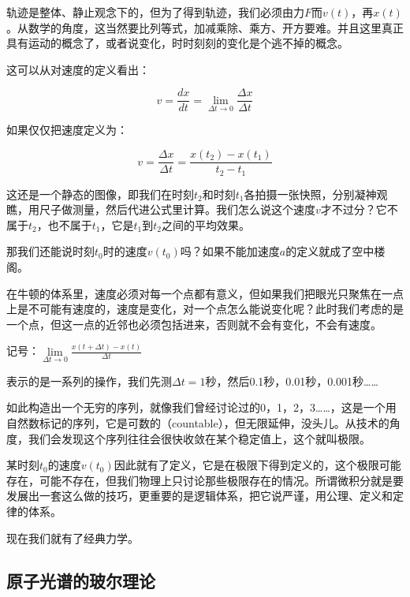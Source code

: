 轨迹是整体、静止观念下的，但为了得到轨迹，我们必须由力$F$而$v(t)$，再$x(t)$。从数学的角度，这当然要比列等式，加减乘除、乘方、开方要难。并且这里真正具有运动的概念了，或者说变化，时时刻刻的变化是个逃不掉的概念。

这可以从对速度的定义看出：

\begin{equation}
v = \frac{d x }{d t} = \lim\limits_{\Delta t \to 0} \frac{\Delta x}{\Delta t}
\end{equation}

如果仅仅把速度定义为：

\begin{equation}
v = \frac{\Delta x}{\Delta t} = \frac{ x(t_2) - x(t_1) }{ t_2 - t_1 }
\end{equation}

这还是一个静态的图像，即我们在时刻$t_2$和时刻$t_1$各拍摄一张快照，分别凝神观瞧，用尺子做测量，然后代进公式里计算。我们怎么说这个速度$v$才不过分？它不属于$t_2$，也不属于$t_1$，它是$t_1$到$t_2$之间的平均效果。

那我们还能说时刻$t_0$时的速度$v(t_0)$吗？如果不能加速度$a$的定义就成了空中楼阁。

在牛顿的体系里，速度必须对每一个点都有意义，但如果我们把眼光只聚焦在一点上是不可能有速度的，速度是变化，对一个点怎么能说变化呢？此时我们考虑的是一个点，但这一点的近邻也必须包括进来，否则就不会有变化，不会有速度。

\begin{center}
记号：$\lim\limits_{\Delta t \to 0} \frac{ x(t + \Delta t) - x(t) }{\Delta t}$
\end{center}

表示的是一系列的操作，我们先测$\Delta t = 1$秒，然后0.1秒，0.01秒，0.001秒……

如此构造出一个无穷的序列，就像我们曾经讨论过的0，1，2，3……，这是一个用自然数标记的序列，它是可数的（countable），但无限延伸，没头儿。从技术的角度，我们会发现这个序列往往会很快收敛在某个稳定值上，这个就叫极限。

某时刻$t_0$的速度$v(t_0)$因此就有了定义，它是在极限下得到定义的，这个极限可能存在，可能不存在，但我们物理上只讨论那些极限存在的情况。所谓微积分就是要发展出一套这么做的技巧，更重要的是逻辑体系，把它说严谨，用公理、定义和定律的体系。

现在我们就有了经典力学。

\subsection{原子光谱的玻尔理论}

